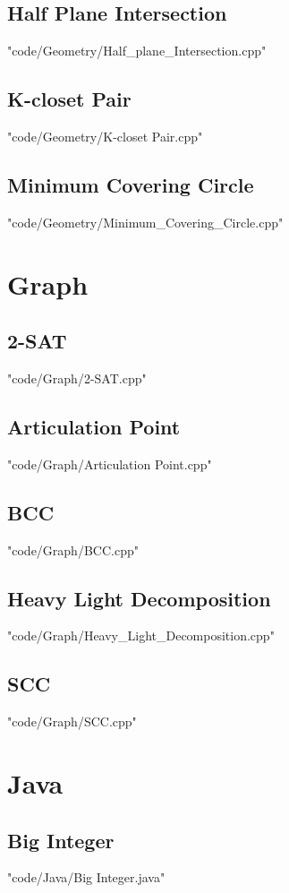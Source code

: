\documentclass [landscape,8pt,a4paper,twocolumn]{article}
\begin{document}
\subsection{Half Plane Intersection}
 {"code/Geometry/Half_plane_Intersection.cpp"}
\subsection{K-closet Pair}
 {"code/Geometry/K-closet Pair.cpp"}
\subsection{Minimum Covering Circle}
 {"code/Geometry/Minimum_Covering_Circle.cpp"}
\section{Graph}
\subsection{2-SAT}
 {"code/Graph/2-SAT.cpp"}
\subsection{Articulation Point}
 {"code/Graph/Articulation Point.cpp"}
\subsection{BCC}
 {"code/Graph/BCC.cpp"}
\subsection{Heavy Light Decomposition}
 {"code/Graph/Heavy_Light_Decomposition.cpp"}
\subsection{SCC}
 {"code/Graph/SCC.cpp"}
\section{Java}
\subsection{Big Integer}
 {"code/Java/Big Integer.java"}
\end{document}

